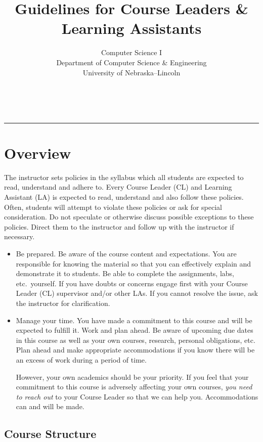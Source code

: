\documentclass[12pt]{scrartcl}
\title{Guidelines for Course Leaders \& Learning Assistants}\let\Title\@title
\subtitle{Computer Science I\\
{\small
\vskip1cm
Department of Computer Science \& Engineering \\
University of Nebraska--Lincoln}
\vskip-3cm}
\date{~}
\begin{document}
\maketitle


\hrule

\section*{Overview}

The instructor sets policies in the syllabus which all students 
are expected to read, understand and adhere to. Every Course Leader
(CL) and Learning Assistant (LA) is expected 
to read, understand and also follow these policies.  Often, 
students will attempt to violate these policies or ask for special 
consideration.  Do not speculate or otherwise discuss possible 
exceptions to these policies.  Direct them to the instructor 
and follow up with the instructor if necessary.

\begin{itemize}
  \item Be prepared.  Be aware of the course content and expectations.
  You are responsible for knowing the material so that you can effectively
  explain and demonstrate it to students.  Be able to complete the assignments, 
  labs, etc.\ yourself.  If you have doubts or concerns engage first with
  your Course Leader (CL) supervisor and/or other LAs.  If you cannot
  resolve the issue, ask the instructor for clarification.
  \item Manage your time.  You have made a commitment to this course and
  will be expected to fulfill it.  Work and plan ahead.  Be aware of 
  upcoming due dates in this course as well as your own courses, research, 
  personal obligations, etc.  Plan ahead and make appropriate accommodations 
  if you know there will be an excess of work during a period of time.

  
  However, your own academics should be your priority.  If you feel that
  your commitment to this course is adversely affecting your own courses,
  \emph{you need to reach out} to your Course Leader so that we can help
  you.  Accommodations can and will be made.
\end{itemize}

\subsection*{Course Structure}
\end{document}
